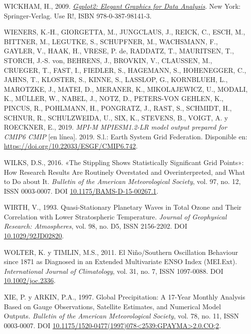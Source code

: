\documentclass[12pt,oneside,a4paper]{reedthesis}
\newlength{\cslhangindent}
\newenvironment{CSLReferences}[2] %
 {%
  \setlength{\parindent}{0pt}
  \ifodd #1 \everypar{\setlength{\hangindent}{\cslhangindent}}\ignorespaces\fi
  \ifnum #2 > 0
  \setlength{\parskip}{#2\baselineskip}
  \fi
 }%
 {}
\begin{document}
\begin{CSLReferences}{1}{0}
\leavevmode{}%
WICKHAM, H., 2009. \emph{\href{https://doi.org/10.1007/978-0-387-98141-3}{Ggplot2: {Elegant Graphics} for {Data Analysis}}}. {New York}: {Springer-Verlag}. Use {R}!, ISBN 978-0-387-98141-3.

\leavevmode{}%
WIENERS, K.-H., GIORGETTA, M., JUNGCLAUS, J., REICK, C., ESCH, M., BITTNER, M., LEGUTKE, S., SCHUPFNER, M., WACHSMANN, F., GAYLER, V., HAAK, H., VRESE, P. de, RADDATZ, T., MAURITSEN, T., STORCH, J.-S. von, BEHRENS, J., BROVKIN, V., CLAUSSEN, M., CRUEGER, T., FAST, I., FIEDLER, S., HAGEMANN, S., HOHENEGGER, C., JAHNS, T., KLOSTER, S., KINNE, S., LASSLOP, G., KORNBLUEH, L., MAROTZKE, J., MATEI, D., MERANER, K., MIKOLAJEWICZ, U., MODALI, K., MÜLLER, W., NABEL, J., NOTZ, D., PETERS-VON GEHLEN, K., PINCUS, R., POHLMANN, H., PONGRATZ, J., RAST, S., SCHMIDT, H., SCHNUR, R., SCHULZWEIDA, U., SIX, K., STEVENS, B., VOIGT, A. y ROECKNER, E., 2019. \emph{MPI-M MPIESM1.2-LR model output prepared for CMIP6 CMIP} {[}en línea{]}. 2019. S.l.: Earth System Grid Federation. Disponible en: \url{https://doi.org/10.22033/ESGF/CMIP6.742}.

\leavevmode{}%
WILKS, D.S., 2016. {«{The Stippling Shows Statistically Significant Grid Points}»}: {How Research Results} Are {Routinely Overstated} and {Overinterpreted}, and {What} to {Do} about {It}. \emph{Bulletin of the American Meteorological Society}, vol. 97, no. 12, ISSN 0003-0007. DOI \href{https://doi.org/10.1175/BAMS-D-15-00267.1}{10.1175/BAMS-D-15-00267.1}.

\leavevmode{}%
WIRTH, V., 1993. Quasi-Stationary Planetary Waves in Total Ozone and Their Correlation with Lower Stratospheric Temperature. \emph{Journal of Geophysical Research: Atmospheres}, vol. 98, no. D5, ISSN 2156-2202. DOI \href{https://doi.org/10.1029/92JD02820}{10.1029/92JD02820}.

\leavevmode{}%
WOLTER, K. y TIMLIN, M.S., 2011. El {Ni{ñ}o}/{Southern Oscillation} Behaviour since 1871 as Diagnosed in an Extended Multivariate {ENSO} Index ({MEI}.Ext). \emph{International Journal of Climatology}, vol. 31, no. 7, ISSN 1097-0088. DOI \href{https://doi.org/10.1002/joc.2336}{10.1002/joc.2336}.

\leavevmode{}%
XIE, P. y ARKIN, P.A., 1997. Global {Precipitation}: {A} 17-{Year Monthly Analysis Based} on {Gauge Observations}, {Satellite Estimates}, and {Numerical Model Outputs}. \emph{Bulletin of the American Meteorological Society}, vol. 78, no. 11, ISSN 0003-0007. DOI \href{https://doi.org/10.1175/1520-0477(1997)078\%3C2539:GPAYMA\%3E2.0.CO;2}{10.1175/1520-0477(1997)078\textless2539:GPAYMA\textgreater2.0.CO;2}.


\end{CSLReferences}
\end{document}
